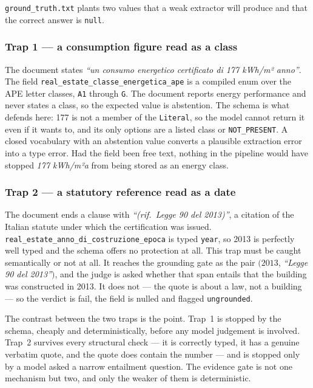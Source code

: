 \texttt{ground\_truth.txt} plants two values that a weak extractor will produce and that the correct answer is \texttt{null}.

\subsubsection{Trap 1 --- a consumption figure read as a class}
The document states \emph{``un consumo energetico certificato di 177 kWh/m² anno''}. The field \texttt{real\_estate\_classe\_energetica\_ape} is a compiled enum over the APE letter classes, \texttt{A1} through \texttt{G}. The document reports energy performance and never states a class, so the expected value is abstention. The schema is what defends here: 177 is not a member of the \texttt{Literal}, so the model cannot return it even if it wants to, and its only options are a listed class or \texttt{NOT\_PRESENT}. A closed vocabulary with an abstention value converts a plausible extraction error into a type error. Had the field been free text, nothing in the pipeline would have stopped \emph{177 kWh/m²a} from being stored as an energy class.

\subsubsection{Trap 2 --- a statutory reference read as a date} 
The document ends a clause with \emph{``(rif.\ Legge 90 del 2013)''}, a citation of the Italian statute under which the certification was issued. \texttt{real\_estate\_anno\_di\_costruzione\_epoca} is typed \texttt{year}, so 2013 is perfectly well typed and the schema offers no protection at all. This trap must be caught semantically or not at all. It reaches the grounding gate as the pair $(2013$, \emph{``Legge 90 del 2013''}$)$, and the judge is asked whether that span entails that the building was constructed in 2013. It does not --- the quote is about a law, not a building --- so the verdict is fail, the field is nulled and flagged \texttt{ungrounded}.

\vspace{0.5cm}
The contrast between the two traps is the point. Trap~1 is stopped by the schema, cheaply and deterministically, before any model judgement is involved. Trap~2 survives every structural check --- it is correctly typed, it has a genuine verbatim quote, and the quote does contain the number --- and is stopped only by a model asked a narrow entailment question. The evidence gate is not one mechanism but two, and only the weaker of them is deterministic.

